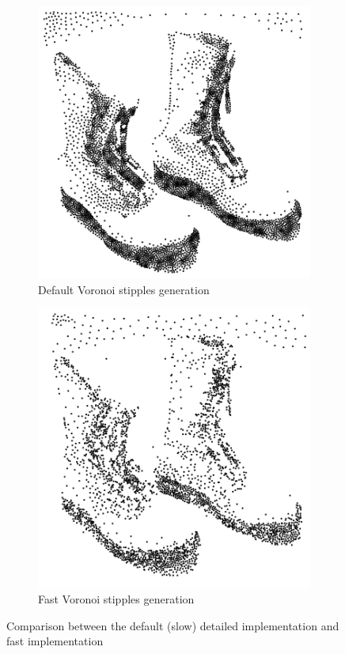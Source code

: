 \begin{figure}[!htb]
\begin{subfigure}[h]{0.4\linewidth}
\includegraphics[width=\linewidth]{images/voronoi_shoes_default_stipples.png}
\caption{Default Voronoi stipples generation}
\end{subfigure}%
\hfill
\begin{subfigure}[h]{0.4\linewidth}
\includegraphics[width=\linewidth]{images/voronoi_shoes_fast_stipples.png}
\caption{Fast Voronoi stipples generation}
\end{subfigure}%
\caption{Comparison between the default (slow) detailed implementation and fast implementation}
\label{comparison-fast}
\end{figure}

